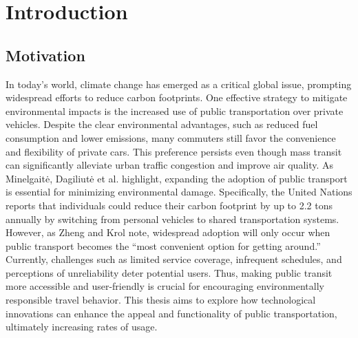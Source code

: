 \chapter{Introduction}
\label{cha:Introduction}

\section{Motivation}
In today's world, climate change has emerged as a critical global issue, prompting widespread efforts to reduce carbon footprints. One effective strategy to mitigate environmental impacts is the increased use of public transportation over private vehicles. Despite the clear environmental advantages, such as reduced fuel consumption and lower emissions, many commuters still favor the convenience and flexibility of private cars. This preference persists even though mass transit can significantly alleviate urban traffic congestion and improve air quality. As Minelgait\.{e}, Dagiliut\.{e} et al. \cite{minelgaitė2020sustainability} highlight, expanding the adoption of public transport is essential for minimizing environmental damage. Specifically, the United Nations \cite{un2023} reports that individuals could reduce their carbon footprint by up to 2.2 tons annually by switching from personal vehicles to shared transportation systems. However, as Zheng and Krol \cite{mit2023} note, widespread adoption will only occur when public transport becomes the “most convenient option for getting around.” Currently, challenges such as limited service coverage, infrequent schedules, and perceptions of unreliability deter potential users. Thus, making public transit more accessible and user-friendly is crucial for encouraging environmentally responsible travel behavior. This thesis aims to explore how technological innovations can enhance the appeal and functionality of public transportation, ultimately increasing rates of usage.

